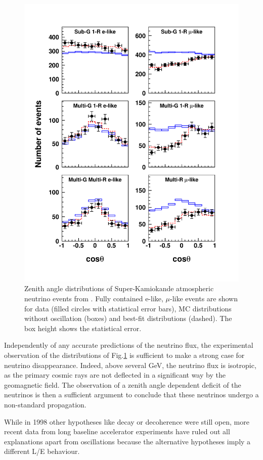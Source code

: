 \begin{figure}[htbp]
\centering
\includegraphics[width=0.8\linewidth]{figures/sk-2006-atm.pdf}
  \caption{Zenith angle distributions of Super-Kamiokande atmospheric neutrino events from \cite{Hosaka:2006zd}. Fully contained
e-like, $\mu$-like events
are shown for data (filled circles with statistical
error bars), MC distributions without oscillation (boxes)
and
best-fit distributions (dashed). The box height shows the
statistical error.}
 \label{fig:sk-atm}
 \end{figure}

Independently of any accurate predictions of the neutrino flux, the experimental observation of the distributions of Fig.\ref{fig:sk-atm} is sufficient to make a strong case for neutrino disappearance. Indeed, above several GeV, the neutrino flux is isotropic, as the primary cosmic rays are not deflected in a significant way by the geomagnetic field. The observation of a zenith angle dependent deficit of the neutrinos is then a sufficient argument to conclude that these neutrinos undergo a non-standard propagation.  

While in 1998 other hypotheses like decay or decoherence were still open, more recent data from long baseline accelerator experiments have ruled out all explanations apart from oscillations because the alternative hypotheses imply a different L/E behaviour. 
    
